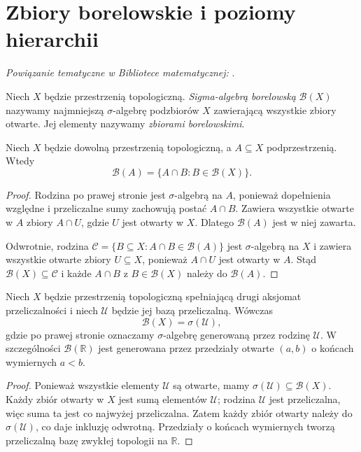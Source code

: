 \section{Zbiory borelowskie i poziomy hierarchii}
\label{sec:topog-polskie-borel}

\noindent\emph{Powiązanie tematyczne w Bibliotece matematycznej:} .


\begin{definicja}
\label{def:topog-polskie-borel}
Niech $X$ będzie przestrzenią
topologiczną. \emph{Sigma-algebrą
borelowską} $\mathcal B(X)$
nazywamy najmniejszą
$\sigma$-algebrę podzbiorów $X$
zawierającą wszystkie zbiory
otwarte. Jej elementy nazywamy
\emph{zbiorami borelowskimi}.
\end{definicja}

\begin{stwierdzenie}
\label{prop:topog-polskie-borel-slad}
Niech $X$ będzie dowolną
przestrzenią topologiczną,
a $A\subseteq X$ podprzestrzenią.
Wtedy
\[
\mathcal B(A)=
\{A\cap B:B\in\mathcal B(X)\}.
\]
\end{stwierdzenie}
\begin{proof}
Rodzina po prawej stronie
jest $\sigma$-algebrą na $A$,
ponieważ dopełnienia względne
i przeliczalne sumy zachowują
postać $A\cap B$.
Zawiera wszystkie otwarte w $A$
zbiory $A\cap U$, gdzie $U$
jest otwarty w $X$.
Dlatego $\mathcal B(A)$ jest
w niej zawarta.

Odwrotnie, rodzina
$\mathcal C=\{B\subseteq X:
A\cap B\in\mathcal B(A)\}$
jest $\sigma$-algebrą na $X$
i zawiera wszystkie otwarte
zbiory $U\subseteq X$,
ponieważ $A\cap U$ jest
otwarty w $A$.
Stąd $\mathcal B(X)\subseteq
\mathcal C$ i każde $A\cap B$
z $B\in\mathcal B(X)$
należy do $\mathcal B(A)$.
\end{proof}

\begin{stwierdzenie}
\label{prop:topog-polskie-borel-przeliczalna-baza}
Niech $X$ będzie przestrzenią
topologiczną spełniającą
drugi aksjomat przeliczalności
i niech $\mathcal U$ będzie
jej bazą przeliczalną.
Wówczas
\[
\mathcal B(X)=\sigma(\mathcal U),
\]
gdzie po prawej stronie oznaczamy
$\sigma$-algebrę generowaną
przez rodzinę $\mathcal U$.
W szczególności $\mathcal B(\mathbb R)$
jest generowana przez
przedziały otwarte $(a,b)$
o końcach wymiernych $a<b$.
\end{stwierdzenie}
\begin{proof}
Ponieważ wszystkie elementy
$\mathcal U$ są otwarte,
mamy $\sigma(\mathcal U)
\subseteq\mathcal B(X)$.
Każdy zbiór otwarty w $X$
jest sumą elementów $\mathcal U$;
rodzina $\mathcal U$ jest
przeliczalna, więc suma ta
jest co najwyżej przeliczalna.
Zatem każdy zbiór otwarty
należy do $\sigma(\mathcal U)$,
co daje inkluzję odwrotną.
Przedziały o końcach wymiernych
tworzą przeliczalną bazę
zwykłej topologii na $\mathbb R$.
\end{proof}

